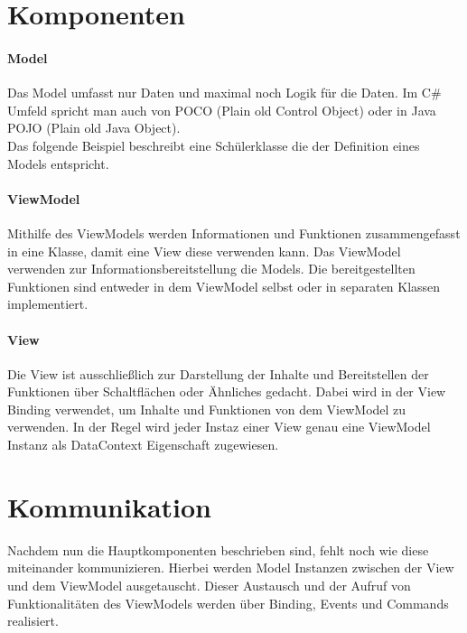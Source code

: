 \documentclass[titlepage=false,12pt]{scrreprt}
\begin{document}
\section{Komponenten}

\paragraph{Model}

Das Model umfasst nur Daten und maximal noch Logik für die Daten. 
Im C\# Umfeld spricht man auch von POCO (Plain old Control Object) 
oder in Java POJO (Plain old Java Object).
\\
Das folgende Beispiel beschreibt eine Schülerklasse die der Definition 
eines Models entspricht.



\paragraph{ViewModel}

Mithilfe des ViewModels werden Informationen und Funktionen zusammengefasst
in eine Klasse, damit eine View diese verwenden kann. Das ViewModel verwenden zur 
Informationsbereitstellung die Models. Die bereitgestellten Funktionen sind
entweder in dem ViewModel selbst oder in separaten Klassen implementiert.

\paragraph{View}

Die View ist ausschließlich zur Darstellung der Inhalte und Bereitstellen der
Funktionen über Schaltflächen oder Ähnliches gedacht. Dabei wird in der View
Binding verwendet, um Inhalte und Funktionen von dem ViewModel zu verwenden.
In der Regel wird jeder Instaz einer View genau eine ViewModel Instanz als DataContext
Eigenschaft zugewiesen.

\section{Kommunikation}

Nachdem nun die Hauptkomponenten beschrieben sind, fehlt noch wie diese miteinander 
kommunizieren. Hierbei werden Model Instanzen zwischen der View und dem ViewModel ausgetauscht.
Dieser Austausch und der Aufruf von Funktionalitäten des ViewModels werden über Binding, 
Events und Commands realisiert.
\end{document}

